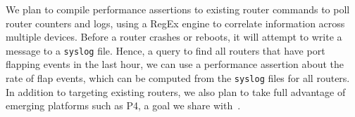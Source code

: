 We plan to compile performance assertions to existing router commands to poll router counters and logs, using a RegEx engine to correlate information across multiple devices. Before a router crashes or reboots, it will attempt to write a message to a \texttt{syslog} file. Hence, a query to find all routers that have port flapping events in the last hour, we can use a performance assertion about the rate of flap events, which can be computed from the \texttt{syslog} files for all routers. In addition to targeting existing routers, we also plan to take full advantage of emerging platforms such as P4, a goal we share with~\cite{srinivasan}. 


